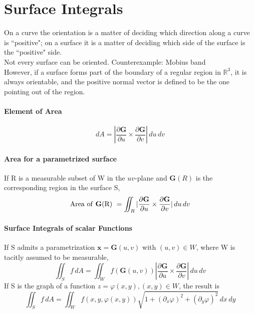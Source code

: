 \documentclass[11pt]{article}
\newcommand{\tb}[1]{\textbf{#1}}
\newcommand{\real}[0]{\mathbb{R}}
\newcommand{\vx}[0]{\tb{x}}
\begin{document}
\section{Surface Integrals}
On a curve the orientation is a matter of deciding which direction along a curve is ``positive"; on a surface it is a matter of deciding which side of the surface is the ``positive" side. \\
Not every surface can be oriented. Counterexample: Mobius band \\
However, if a surface forms part of the boundary of a regular region in $\real^3$, it is always orientable, and the positive normal vector is defined to be the one pointing out of the region.
\paragraph{Element of Area}
$$dA = |\frac{\partial \tb{G}}{\partial u} \times \frac{\partial \tb{G}}{\partial v}| \, du\, dv$$
\paragraph{Area for a parametrized surface}
If R is a measurable subset of W in the $uv$-plane and $\tb{G}(R)$ is the corresponding region in the surface S,
$$\mbox{Area of \tb{G}(R) } = \iint_R|\frac{\partial \tb{G}}{\partial u} \times \frac{\partial \tb{G}}{\partial v}| \, du\, dv$$
\paragraph{Surface Integrals of scalar Functions}
If S admits a parametrization $\vx = \tb{G}(u,v)$ with $(u,v)\in W$, where W is tacitly assumed to be measurable,
$$\iint_S f \, dA = \iint_W f(\tb{G}(u,v))|\frac{\partial \tb{G}}{\partial u}\times \frac{\partial \tb{G}}{\partial v}| \, du\, dv$$
If S is the graph of a function $z = \varphi(x, y), (x,y) \in W$, the result is
$$\iint_S f\, dA = \iint_W f(x,y,\varphi(x,y))\sqrt{1+(\partial_x \varphi)^2 + (\partial_y \varphi)^2}\, dx \, dy$$
\end{document}

